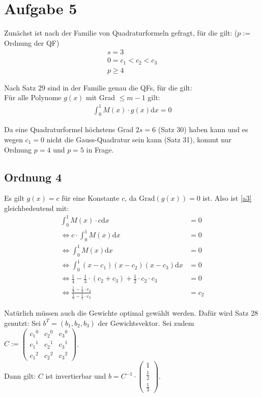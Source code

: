 \section*{Aufgabe 5}

Zunächst ist nach der Familie von Quadraturformeln gefragt, für die gilt: ($p := $ Ordnung der QF)
\begin{align}
	s = 3 \\
	0 = c_1 < c_2 < c_3 \\
	p \ge 4
\end{align}

Nach Satz 29 sind in der Familie genau die QFs, für die gilt: \\
Für alle Polynome $g(x)$ mit Grad $\le m-1$ gilt:
\begin{align}
	 \int_0^1 M(x) \cdot g(x) \mathrm{d}x = 0 \label{a3}
\end{align}

Da eine Quadraturformel höchstens Grad $2s=6$ (Satz 30) haben kann und es wegen
$c_1 = 0$ nicht die Gauss-Quadratur sein kann (Satz 31), kommt nur Ordnung $p=4$
und $p=5$ in Frage.

\subsection*{Ordnung 4}
Es gilt $g(x) = c$ für eine Konstante $c$, da $\text{Grad}(g(x))=0$ ist. 
Also ist \ref{a3} gleichbedeutend mit:
\begin{align}
	 \int_0^1 M(x) \cdot c \mathrm{d}x &= 0 \\
	 \Leftrightarrow c \cdot \int_0^1 M(x) \mathrm{d}x &= 0 \\
 	 \Leftrightarrow \int_0^1 M(x) \mathrm{d}x &= 0 \\
 	 \Leftrightarrow \int_0^1 (x-c_1)(x-c_2)(x-c_3) \mathrm{d}x &= 0 \\
 	 \Leftrightarrow \frac{1}{4} - \frac{1}{3} \cdot (c_2 + c_3) + \frac{1}{2} \cdot c_2 \cdot c_3 &= 0 \\
 	 \Leftrightarrow \frac{\frac{1}{4} - \frac{1}{3} \cdot c_3}
 	                      {\frac{1}{3} - \frac{1}{2} \cdot c_3} &= c_2
\end{align}

Natürlich müssen auch die Gewichte optimal gewählt werden. Dafür wird Satz 28 genutzt:
Sei $b^T = (b_1, b_2, b_3)$ der Gewichtsvektor. Sei zudem $C :=
\begin{pmatrix}
    {c_1}^0 & {c_2}^0 & {c_3}^0 \\
    {c_1}^1 & {c_2}^1 & {c_3}^1 \\
    {c_1}^2 & {c_2}^2 & {c_3}^2
\end{pmatrix}
$. \\
Dann gilt: $C$ ist invertierbar und $b = C^{-1} \cdot
\begin{pmatrix}
    1 \\
    \frac{1}{2} \\
    \frac{1}{3}
\end{pmatrix}
$.

